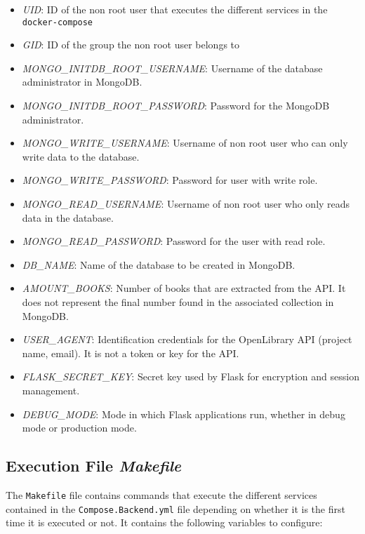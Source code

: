 \documentclass[12pt,a4paper]{article}
\begin{document}
{{            \begin{itemize}[label=$\bullet$]
                \item \emph{UID}: ID of the non root user that executes the different services in the \verb*|docker-compose|
                \item \emph{GID}: ID of the group the non root user belongs to
                
                \item \emph{MONGO\_INITDB\_ROOT\_USERNAME}: Username of the database administrator in MongoDB.
                \item \emph{MONGO\_INITDB\_ROOT\_PASSWORD}: Password for the MongoDB administrator.
                
                \item \emph{MONGO\_WRITE\_USERNAME}: Username of non root user who can only write data to the database.
                \item \emph{MONGO\_WRITE\_PASSWORD}: Password for user with write role.
                \item \emph{MONGO\_READ\_USERNAME}: Username of non root user who only reads data in the database.
                \item \emph{MONGO\_READ\_PASSWORD}: Password for the user with read role.
                
                \item \emph{DB\_NAME}: Name of the database to be created in MongoDB.
                
                \item \emph{AMOUNT\_BOOKS}: Number of books that are extracted from the API. It does not represent the final number found in the associated collection in MongoDB.
                \item \emph{USER\_AGENT}: Identification credentials for the OpenLibrary API (project name, email). It is not a token or key for the API.
                
                \item \emph{FLASK\_SECRET\_KEY}: Secret key used by Flask for encryption and session management.
                \item \emph{DEBUG\_MODE}: Mode in which Flask applications run, whether in debug mode or production mode.
            \end{itemize}
        }

        \subsection{Execution File \emph{Makefile}}\label{sec:ConfExec}
        {
            The \verb*|Makefile| file contains commands that execute the different 
            services contained in the \verb*|Compose.Backend.yml| file depending on 
            whether it is the first time it is executed or not. It contains the 
            following variables to configure:

}}
\end{document}
